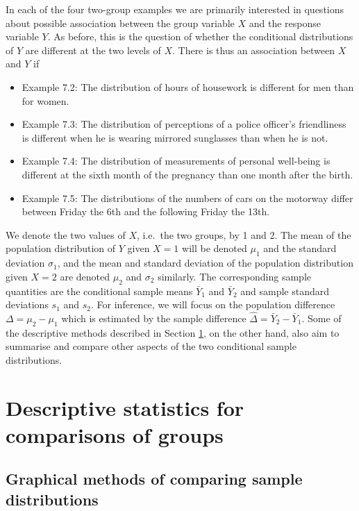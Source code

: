 In each of the four two-group examples we are primarily interested in
questions about possible association between the group variable $X$ and
the response variable $Y$. As before, this is the question of whether
the conditional distributions of $Y$ are different at the two levels
of $X$. There is thus an association between $X$ and $Y$ if
\begin{itemize}
\item
Example 7.2: The distribution of hours of housework is different for men
than for women.
\item
Example 7.3: The distribution of perceptions of a police officer's
friendliness is
different when he is wearing mirrored sunglasses than when he is not.
\item
Example 7.4: The distribution of measurements of personal well-being
is different at the sixth month of the pregnancy
than one month after the birth.
\item
Example 7.5: The distributions of the numbers of cars on the motorway
differ between Friday the 6th and the following Friday the 13th.
\end{itemize}
We denote the two values of $X$, i.e.\ the two groups, by 1 and 2. The
mean of the population distribution of $Y$ given $X=1$ will be denoted
$\mu_{1}$ and the standard deviation $\sigma_{1}$, and the mean and
standard deviation of the population distribution given $X=2$ are
denoted $\mu_{2}$ and $\sigma_{2}$ similarly. The corresponding sample
quantities are the conditional sample means $\bar{Y}_{1}$ and
$\bar{Y}_{2}$ and sample standard deviations $s_{1}$ and $s_{2}$.
For inference, we will focus on the population difference $\Delta=\mu_{2}-\mu_{1}$ which
is estimated by the sample difference
$\hat{\Delta}=\bar{Y}_{2}-\bar{Y}_{1}$.
Some of the descriptive methods described in Section
\ref{s_means_descr}, on the other hand, also
aim to summarise and compare other aspects of the two conditional sample
distributions.

\section{Descriptive statistics for comparisons of groups}
\label{s_means_descr}


\subsection{Graphical methods of comparing sample distributions}
\label{ss_means_descr_graphs}

